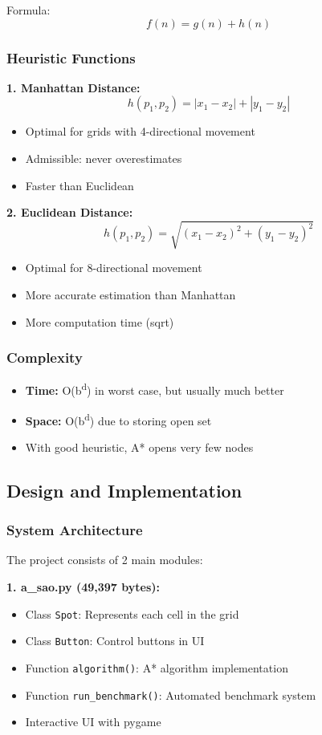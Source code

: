 \documentclass[12pt,a4paper]{article}
\begin{document}
Formula: 
\[f(n) = g(n) + h(n)\]

\subsubsection{Heuristic Functions}
\textbf{1. Manhattan Distance:}
\[h(p_1, p_2) = |x_1 - x_2| + |y_1 - y_2|\]
\begin{itemize}
    \item Optimal for grids with 4-directional movement
    \item Admissible: never overestimates
    \item Faster than Euclidean
\end{itemize}

\textbf{2. Euclidean Distance:}
\[h(p_1, p_2) = \sqrt{(x_1 - x_2)^2 + (y_1 - y_2)^2}\]
\begin{itemize}
    \item Optimal for 8-directional movement
    \item More accurate estimation than Manhattan
    \item More computation time (sqrt)
\end{itemize}

\subsubsection{Complexity}
\begin{itemize}
    \item \textbf{Time:} O(b\textsuperscript{d}) in worst case, but usually much better
    \item \textbf{Space:} O(b\textsuperscript{d}) due to storing open set
    \item With good heuristic, A* opens very few nodes
\end{itemize}

\subsection{Design and Implementation}

\subsubsection{System Architecture}
The project consists of 2 main modules:

\textbf{1. a\_sao.py (49,397 bytes):}
\begin{itemize}
    \item Class \texttt{Spot}: Represents each cell in the grid
    \item Class \texttt{Button}: Control buttons in UI
    \item Function \texttt{algorithm()}: A* algorithm implementation
    \item Function \texttt{run\_benchmark()}: Automated benchmark system
    \item Interactive UI with pygame
\end{itemize}
\end{document}

